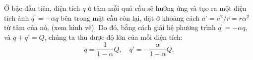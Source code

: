 \begin{loigiai}
\begin{enumerate}[1)]
Ở bậc đầu tiên, điện tích $q$ ở tâm mỗi quả cầu sẽ hưởng ứng và tạo ra một điện tích ảnh $q^\prime = -\alpha q$ bên trong mặt cầu còn lại, đặt ở khoảng cách $a’ = a^2/r = r \alpha^2$ từ tâm của nó, (xem hình vẽ). Do đó, bằng cách giải hệ phương trình $q^\prime=-\alpha q$, và $q+q’=Q$, chúng ta thu được độ lớn của mỗi điện tích:\\
   \[ q = \frac{1}{1-\alpha}Q, \quad q’ = - \frac{\alpha}{1- \alpha}Q. \tag{1} \]

   \begin{center}



\begin{tikzpicture}[x=0.75pt,y=0.75pt,yscale=-1,xscale=1]


\end{tikzpicture}
\end{center}
\end{enumerate}
\end{loigiai}
